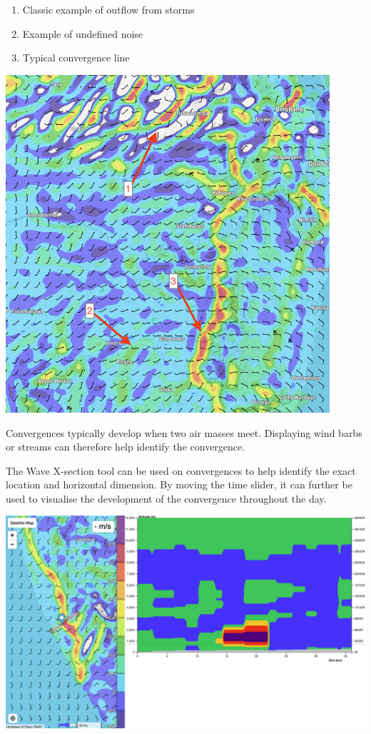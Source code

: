 \documentclass[11pt,a4paper]{article}
\begin{document}
\begin{enumerate}
\item Classic example of outflow from storms
\item Example of undefined noise
\item Typical convergence line
\end{enumerate}

\begin{center}
\includegraphics[width=12cm]{images/convergence.png}
\end{center}
\pagebreak

Convergences typically develop when two air masses meet. Displaying wind barbs or streams can therefore help identify the convergence.

The Wave X-section tool can be used on convergences to help identify the exact location and horizontal dimension. By moving the time slider, it can further be used to visualise the development of the convergence throughout the day.

\begin{center}
\includegraphics[width=14cm]{images/convergence_section.png}
\end{center}
\end{document}
